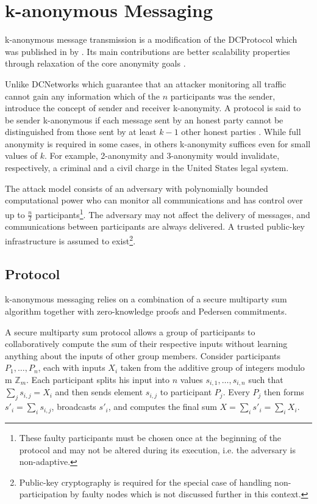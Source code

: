 \section{k-anonymous Messaging} \label{sec:k-anonymous_messaging}


k-anonymous message transmission is a modification of the \ac{DCProtocol} which was published in \citeyear{von2003k} by \citeauthor{von2003k}. Its main contributions are better scalability properties through relaxation
of the core anonymity goals \cite{von2003k}.

Unlike \acp{DCNetwork} which guarantee that an attacker monitoring all traffic cannot gain
any information which of the $n$ participants was the sender, \citeauthor{von2003k} introduce
the concept of sender and receiver k-anonymity. A protocol is said to be sender k-anonymous
if each message sent by an honest party cannot be distinguished from those sent by at least $k - 1$
other honest parties \cite{von2003k}. While full anonymity is required in some cases, in others
k-anonymity suffices even for small values of $k$. For example, 2-anonymity and 3-anonymity would invalidate, respectively, a criminal and a civil charge in the United States legal system.

The attack model consists of an adversary with polynomially bounded computational power
who can monitor all communications and
has control over up to $\frac{n}{2}$ participants\footnote{
These faulty participants must be chosen once at the beginning of the protocol and may not
be altered during its execution, i.e. the adversary is non-adaptive.}. The adversary may not affect
the delivery of messages, and communications between participants are always delivered.
A trusted public-key infrastructure is assumed to exist\footnote{Public-key cryptography is
required for the special case of handling non-participation by faulty nodes which is not discussed further
in this context.}.

\subsection{Protocol}

k-anonymous messaging relies on a combination of a secure multiparty sum algorithm
together with zero-knowledge proofs and Pedersen commitments.

A secure multiparty sum protocol allows a group of participants to collaboratively
compute the sum of their respective inputs without learning anything about the
inputs of other group members. Consider participants $P_1, \ldots, P_n$, each with
inputs $X_i$ taken from the additive group of integers modulo m $\mathbb{Z}_m$.
Each participant splits his input into $n$ values $s_{i,1}, \ldots, s_{i,n}$ such that $\sum_j s_{i,j} = X_i$
and then sends element $s_{i,j}$ to participant $P_j$. Every $P_j$ then forms
$s'_i = \sum_i s_{i,j}$, broadcasts $s'_i$, and computes the final sum $X = \sum_i s'_i = \sum_i X_i$.

